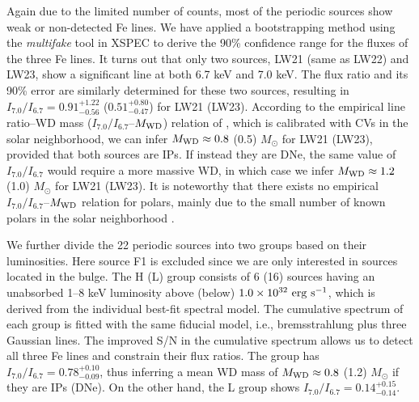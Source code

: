 \documentclass[twoside,twocolumn]{aastex63}
\begin{document}
Again due to the limited number of counts, most of the periodic sources show weak or non-detected Fe lines.  
We have applied a bootstrapping method using the {\it multifake} tool in XSPEC to derive the 90\% confidence range for the fluxes of the three Fe lines. It turns out that only two sources, LW21 (same as LW22) and LW23, show a significant line at both 6.7 keV and 7.0 keV.  
The flux ratio and its 90\% error are similarly determined for these two sources, resulting in $I_{7.0}/I_{6.7} = 0.91^{+1.22}_{-0.56}$ ($0.51^{+0.80}_{-0.47}$) for LW21 (LW23).   
According to the empirical line ratio--WD mass  ($I_{7.0}/I_{6.7}$--$M_{\rm WD}$) relation of \citet{2019ApJ...882..164X}, which is calibrated with CVs in the solar neighborhood, we can infer $M_{\rm WD} \approx 0.8$ (0.5) $M_\odot$ for LW21 (LW23), provided that both sources are IPs. If instead they are DNe, the same value of $I_{7.0}/I_{6.7}$ would require a more massive WD, in which case we infer $M_{\rm WD} \approx 1.2$ (1.0) $M_\odot$ for LW21 (LW23).
It is noteworthy that there exists no empirical $I_{7.0}/I_{6.7}$--$M_{\rm WD}$ relation for polars, mainly due to the small number of known polars in the solar neighborhood \citep{2019ApJ...882..164X}. 

We further divide the 22 periodic sources into two groups based on their luminosities. Here source F1 is excluded since we are only interested in sources located in the bulge. The H (L) group consists of 6 (16) sources having an unabsorbed 1--8 keV luminosity above (below) $\rm 1.0\times10^{32}~erg ~s^{-1}$, which is derived from the individual best-fit spectral model. 
The cumulative spectrum of each group is fitted with the same fiducial model, i.e., bremsstrahlung plus three Gaussian lines. The improved S/N in the cumulative spectrum allows us to detect all three Fe lines and constrain their flux ratios.  
The group has $I_{7.0}/I_{6.7} = 0.78^{+0.10}_{-0.09}$, thus inferring a mean WD mass of $M_{\rm WD} \approx 0.8$ (1.2) $M_\odot$ if they are IPs (DNe). 
On the other hand, the L group shows $I_{7.0}/I_{6.7} = 0.14^{+0.15}_{-0.14}$.
\end{document}
